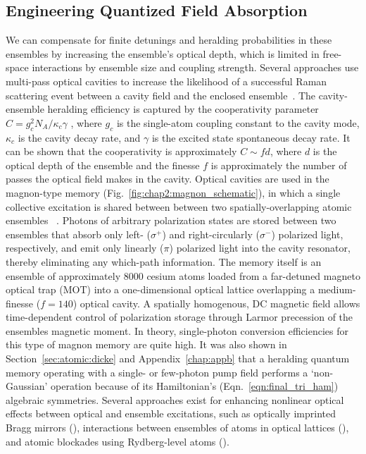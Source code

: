 \documentclass[aps,twocolumn,secnumarabic,amsmath,amssymb,pra,groupedaddress,
showpacs, showkeys,draft]{revtex4-1}
\begin{document}
\subsection{Engineering Quantized Field Absorption\label{sec:atomic:dlcz}}

We can compensate for finite detunings and heralding probabilities in these
ensembles by increasing the ensemble's optical depth, which is limited in
free-space interactions by ensemble size and coupling strength. Several
approaches use multi-pass optical cavities to increase the likelihood of a
successful Raman scattering event between a cavity field and the enclosed
ensemble~\cite{PhysRevLett.92.123601, PhysRevLett.95.133601,
  PhysRevLett.98.190503,Thompson07072006,PhysRevLett.98.183601}. The
cavity-ensemble heralding efficiency is captured by the cooperativity parameter
$C=g_c^2 N_A/\kappa_c \gamma$ , where $g_c$ is the single-atom coupling
constant to the cavity mode, $\kappa_c$ is the cavity decay rate, and $\gamma$
is the excited state spontaneous decay rate. It can be shown that the
cooperativity is approximately $C\sim fd$, where $d$ is the optical depth of
the ensemble and the finesse ${f}$ is approximately the number of passes the
optical field makes in the cavity. Optical cavities are used in the magnon-type
memory (Fig.~\ref{fig:chap2:magnon_schematic}), in which a single collective
excitation is shared between between two spatially-overlapping atomic ensembles
~\cite{PhysRevLett.103.043601}. Photons of arbitrary polarization states are
stored between two ensembles that absorb only left- ($\sigma^{+}$) and
right-circularly ($\sigma^{-}$) polarized light, respectively, and emit only
linearly ($\pi$) polarized light into the cavity resonator, thereby eliminating
any which-path information. The memory itself is an ensemble of approximately
8000 cesium atoms loaded from a far-detuned magneto optical trap (MOT) into a
one-dimensional optical lattice overlapping a medium-finesse ($f=140$) optical
cavity. A spatially homogenous, DC magnetic field allows time-dependent control
of polarization storage through Larmor precession of the ensembles magnetic
moment. In theory, single-photon conversion efficiencies for this type of
magnon memory are quite high. It was also shown in
Section~\ref{sec:atomic:dicke} and Appendix~\ref{chap:appb} that a heralding
quantum memory operating with a single- or few-photon pump field performs a
`non-Gaussian' operation because of its Hamiltonian's
(Eqn.~\ref{eqn:final_tri_ham}) algebraic symmetries. Several approaches exist
for enhancing nonlinear optical effects between optical and ensemble
excitations, such as optically imprinted Bragg mirrors
(\cite{PhysRevLett.89.143602, nature02176}), interactions between ensembles of
atoms in optical lattices (\cite{PhysRevLett.100.063601}), and atomic blockades
using Rydberg-level atoms (\cite{PhysRevLett.87.037901}). 
\end{document}
